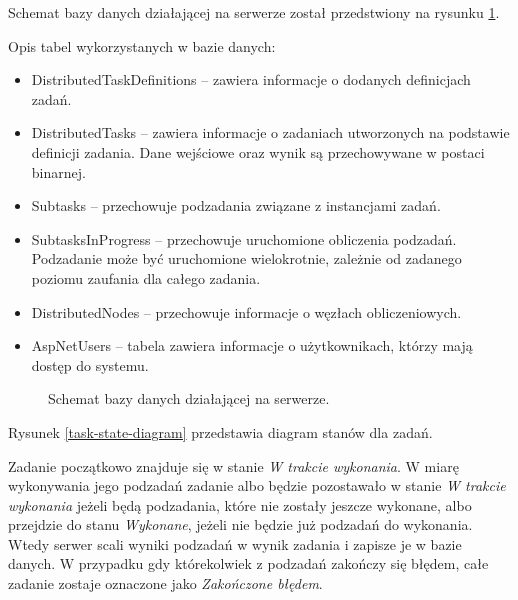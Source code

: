 \documentclass[a4paper,11pt,twoside]{report}
\theoremstyle{definition}
\begin{document}
Schemat bazy danych działającej na serwerze został przedstwiony na rysunku \ref{database-schema}.

Opis tabel wykorzystanych w bazie danych:
\begin{itemize}
	\item DistributedTaskDefinitions -- zawiera informacje o dodanych definicjach zadań.
	\item DistributedTasks -- zawiera informacje o zadaniach utworzonych na podstawie definicji zadania. Dane wejściowe oraz wynik są przechowywane w postaci binarnej.
	\item Subtasks -- przechowuje podzadania związane z instancjami zadań.
	\item SubtasksInProgress -- przechowuje uruchomione obliczenia podzadań. Podzadanie może być uruchomione wielokrotnie, zależnie od zadanego poziomu zaufania dla całego zadania.
	\item DistributedNodes -- przechowuje informacje o węzłach obliczeniowych.
	\item AspNetUsers -- tabela zawiera informacje o użytkownikach, którzy mają dostęp do systemu. 
\end{itemize}

\begin{figure}[H] 
	\caption{Schemat bazy danych działającej na serwerze.}
	\label{database-schema}
\end{figure}


Rysunek \ref{task-state-diagram} przedstawia diagram stanów dla zadań.

Zadanie początkowo znajduje się w stanie \textit{W trakcie wykonania}. W miarę wykonywania jego podzadań zadanie albo będzie pozostawało w stanie \textit{W trakcie wykonania} jeżeli będą podzadania, które nie zostały jeszcze wykonane, albo przejdzie do stanu \textit{Wykonane}, jeżeli nie będzie już podzadań do wykonania. Wtedy serwer scali wyniki podzadań w wynik zadania i zapisze je w bazie danych. W przypadku gdy którekolwiek z podzadań zakończy się błędem, całe zadanie zostaje oznaczone jako \textit{Zakończone błędem}.
\end{document}
